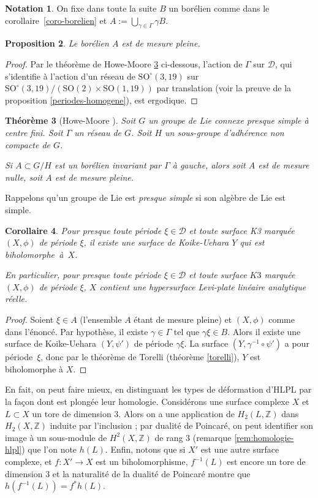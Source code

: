 \documentclass[JEP,XML,SOM,Unicode,francais,published]{cedram}
\newcommand{\Z}{\mathbb{Z}}
\newcommand{\SO}{\mathrm{SO}}
\newtheorem{thm}{Théorème}
\newtheorem{coro}[thm]{Corollaire}
\newtheorem{prop}[thm]{Proposition}
\theoremstyle{definition}
\newtheorem{notation}[thm]{Notation}
\begin{document}
\begin{notation}
On fixe dans toute la suite $B$ un borélien comme dans le corollaire~\ref{coro-borelien} et $A:= \bigcup_{\gamma \in \Gamma} \gamma B$.
\end{notation}
\begin{prop}Le borélien $A$ est de mesure pleine.
\end{prop}
\begin{proof}
Par le théorème de Howe-Moore \ref{howe-moore} ci-dessous, l'action de $\Gamma$ sur $\mathscr{D}$, qui s'identifie à l'action d'un réseau de $\SO^\circ(3, 19)$ sur $\SO^\circ(3, 19)/\left(\SO(2){\times} \SO(1, 19)\right)$ par translation (voir la preuve de la proposition \ref{periodes-homogene}), est ergodique.
\end{proof}

\begin{thm}[Howe-Moore \cite{zimmer2013ergodic}]
\label{howe-moore}
Soit $G$ un groupe de Lie connexe presque simple à centre fini. Soit $\Gamma$ un réseau de $G$.
Soit $H$ un sous-groupe d'adhérence non compacte de $G$.

Si $A \subset G/H$ est un borélien invariant par $\Gamma$ à gauche, alors soit $A$ est de mesure nulle, soit $A$ est de mesure pleine.
\end{thm}

Rappelons qu'un groupe de Lie est \emph{presque simple} si son algèbre de Lie est simple.

\begin{coro}
Pour presque toute période $\xi \in \mathscr{D}$ et toute surface K3 marquée $(X, \phi)$ de période $\xi$, il existe une surface de Koike-Uehara $Y$ qui est biholomorphe~à~$X$.

En particulier, pour presque toute période $\xi \in \mathscr{D}$ et toute surface $K3$ marquée $(X, \phi)$ de période $\xi$, $X$ contient une hypersurface Levi-plate linéaire analytique réelle.
\end{coro}
\begin{proof}
Soient $\xi \in A$ (l'ensemble $A$ étant de mesure pleine) et $(X, \phi)$ comme dans l'énoncé. Par hypothèse, il existe $\gamma \in \Gamma$ tel que $\gamma \xi \in B$. Alors il existe une surface de Koike-Uehara $(Y, \psi')$ de période $\gamma\xi$. La surface $(Y, \gamma^{-1}\circ\psi')$ a pour période~$\xi$, donc par le théorème de Torelli (théorème \ref{torelli}), $Y$ est biholomorphe à $X$.
\end{proof}

En fait, on peut faire mieux, en distinguant les types de déformation d'HLPL par la façon dont est plongée leur homologie. Considérons une surface complexe $X$ et $L \subset X$ un tore de dimension $3$. Alors on a une application de $H_2(L, \Z)$ dans $H_2(X, \Z)$ induite par l'inclusion ; par dualité de Poincaré, on peut identifier son image à un sous-module de $H^2(X, \Z)$ de rang $3$ (\cf remarque \ref{rem:homologie-hlpl}) que l'on note $h(L)$. Enfin, notons que si $X'$ est une autre surface complexe, et $f \colon X' \to X$ est un biholomorphisme, $f^{-1}(L)$ est encore un tore de dimension $3$ et la naturalité de la dualité de Poincaré montre que $h(f^{-1}(L)) = f^*h(L)$.
\end{document}
